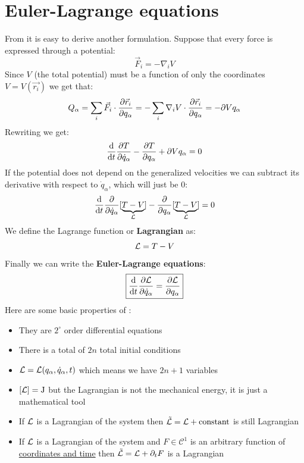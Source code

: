 \section{Euler-Lagrange equations}
From \lagrangeref\;it is easy to derive another formulation. Suppose that every force is expressed through a potential:
\begin{equation}
    \vec{F}_i = -\nabla_i V
\end{equation}
Since $V$ (the total potential) must be a function of only the coordinates $V = V(\vec{r_i})$ we get that:
\begin{equation}
    Q_{\alpha} = \displaystyle\sum_i \vec{F}_i \cdot \dfrac{\partial \vec{r}_i}{\partial q_{\alpha}} = - \displaystyle\sum_i \nabla_i V \cdot \dfrac{\partial \vec{r}_i}{\partial q_{\alpha}} = -\partial{V}{q_{\alpha}}
\end{equation}
Rewriting \lagrangeref\;we get:
\begin{equation}
    \dv{}{t}\dfrac{\partial T}{\partial \dot{q}_{\alpha}} - \dfrac{\partial T}{\partial q_{\alpha}} + \partial{V}{q_{\alpha}} = 0
\end{equation}
If the potential does not depend on the generalized velocities we can subtract its derivative with respect to $\dot{q}_{\alpha}$, which will just be 0:
\begin{equation}
    \dv{}{t}\dfrac{\partial }{\partial \dot{q}_{\alpha}}[\underbrace{T-V}_\lagr ] - \dfrac{\partial}{\partial q_{\alpha}}[\underbrace{T-V}_\lagr ] = 0
\end{equation}
We define the Lagrange function or \textbf{Lagrangian} as:
\begin{equation}
    \mathcal{L}  = T - V
\end{equation}
Finally we can write the \textbf{Euler-Lagrange equations}:
\begin{equation} \label{Euler_Lagrange_equations}
    \boxed{\dv{}{t}\pdv{\lagr}{\dot{q}_{\alpha}} = \pdv{\lagr}{q_{\alpha}}}
\end{equation}
Here are some basic properties of \eleref :
\begin{itemize}
    \item They are $2^\circ$ order differential equations
    \item There is a total of $2n$ total initial conditions
    \item $\mathcal{L} = \mathcal{L}(q_{\alpha},\dot{q}_{\alpha},t)$ which means we have $2n+1$ variables
    \item $[\mathcal{L}] = \mathrm{J}$ but the Lagrangian is not the mechanical energy, it is just a mathematical tool
    \item If $\mathcal{L}$ is a Lagrangian of the system then $\tilde{\mathcal{L}} = \mathcal{L} + \mathrm{constant}$ is still Lagrangian
    \item If $\mathcal{L}$ is a Lagrangian of the system and $F\in \mathcal{C}^1$ is an arbitrary function of \underline{coordinates and time} then $\tilde{\mathcal{L}} = \mathcal{L} + \partial_t F$ is a Lagrangian
\end{itemize}

